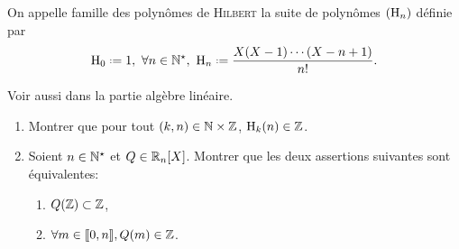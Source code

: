 \begin{defi}
    On appelle famille des polynômes de \textsc{Hilbert} la suite de polynômes $(\mathrm{H}_n)$ définie par
    $$\Hilb_0 \defeq 1,\ \forall n \in \Ne,\ \Hilb_n \defeq \frac{X(X-1)\cdots(X-n+1)}{n!}.$$
\end{defi}

Voir aussi  dans la partie algèbre linéaire. 

\begin{exercice}
    \begin{enumerate}
        \item Montrer que pour tout $(k, n) \in \mathbb{N} \times \mathbb{Z}$, $\mathrm{H}_k(n) \in \mathbb{Z}$.
        \item Soient $n \in \mathbb{N}^\star$ et $Q \in \mathbb{R}_n[X]$. Montrer que les deux assertions suivantes sont équivalentes:
        \begin{enumerate}[label=(\roman*)]
            \item $Q(\mathbb{Z}) \subset \mathbb{Z}$,
            \item $\forall m \in \llbracket 0, n \rrbracket, Q(m) \in \mathbb{Z}$.
        \end{enumerate}
    \end{enumerate}
\end{exercice}